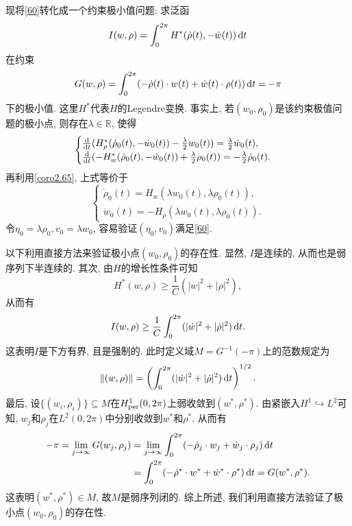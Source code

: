 \documentclass[12pt,a4paper]{article}
\begin{document}
现将\eqref{60}转化成一个约束极小值问题: 求泛函 
\begin{equation*}
    I(w, \rho) = \int_0^{2\pi}H^*(\dot\rho(t), -\dot w(t)) \,{\rm d}t
\end{equation*}
在约束 
\begin{equation*}
    G(w, \rho) = \int_0^{2\pi}(-\dot\rho(t) \cdot w(t) + \dot w(t) \cdot \rho(t)) \,{\rm d}t = -\pi
\end{equation*}
下的极小值. 这里$H^*$代表$H$的Legendre变换. 事实上, 若$(w_0, \rho_0)$是该约束极值问题的极小点, 则存在$\lambda \in \mathbb{R}$, 使得 
\begin{equation*}
    \begin{cases}
        \frac{{\rm d}}{{\rm d}t}(H_{\rho}^*(\dot\rho_0(t), -\dot w_0(t)) - \frac{\lambda}{2} w_0(t)) = \frac{\lambda}{2} \dot w_0(t), \\ 
        \frac{{\rm d}}{{\rm d}t}(-H_w^*(\dot\rho_0(t), -\dot w_0(t)) + \frac{\lambda}{2}\rho_0(t)) = -\frac{\lambda}{2} \dot\rho_0(t).
    \end{cases}
\end{equation*}
再利用\ref{coro2.65}, 上式等价于 
\begin{equation*}
    \begin{cases}
        \dot\rho_0(t) = H_w(\lambda w_0(t), \lambda\rho_0(t)), \\
        \dot w_0(t) = -H_{\rho}(\lambda w_0(t), \lambda\rho_0(t)).
    \end{cases}
\end{equation*}
令$\eta_0 = \lambda\rho_0, v_0 = \lambda w_0$, 容易验证$(\eta_0, v_0)$满足\eqref{60}.

以下利用直接方法来验证极小点$(w_0, \rho_0)$的存在性. 显然, $I$是连续的, 从而也是弱序列下半连续的.
其次, 由$H$的增长性条件可知 
\begin{equation*}
    H^*(w, \rho) \geq \frac{1}{C}(|w|^2 + |\rho|^2),
\end{equation*}
从而有 
\begin{equation*}
    I(w, \rho) \geq \frac{1}{C}\int_0^{2\pi}(|\dot w|^2 + |\dot \rho|^2) \,{\rm d}t.
\end{equation*}
这表明$I$是下方有界, 且是强制的. 此时定义域$M = G^{-1}(-\pi)$上的范数规定为 
\begin{equation*}
    \Vert (w, \rho)\Vert = \left(\int_0^{2\pi}(|\dot w|^2 + |\dot \rho|^2) \,{\rm d}t\right)^{1/2}.
\end{equation*}
最后, 设$\{(w_i, \rho_i)\} \subseteq M$在$H_{{\rm per}}^1(0, 2\pi)$上弱收敛到$(w^*, \rho^*)$.
由紧嵌入$H^1 \hookrightarrow L^2$可知, $w_j$和$\rho_j$在$L^2(0, 2\pi)$中分别收敛到$w^*$和$\rho^*$.
从而有 
\begin{align*}
    -\pi = \lim\limits_{j \rightarrow \infty}G(w_j, \rho_j) &= \lim\limits_{j \rightarrow \infty}\int_0^{2\pi}(-\dot\rho_j \cdot w_j + \dot w_j \cdot \rho_j) \,{\rm d}t \\ 
    &= \int_0^{2\pi}(-\dot\rho^* \cdot w^* + \dot w^* \cdot \rho^*) \,{\rm d}t = G(w^*, \rho^*).
\end{align*}
这表明$(w^*, \rho^*) \in M$, 故$M$是弱序列闭的. 综上所述, 我们利用直接方法验证了极小点$(w_0, \rho_0)$的存在性.
\end{document}
